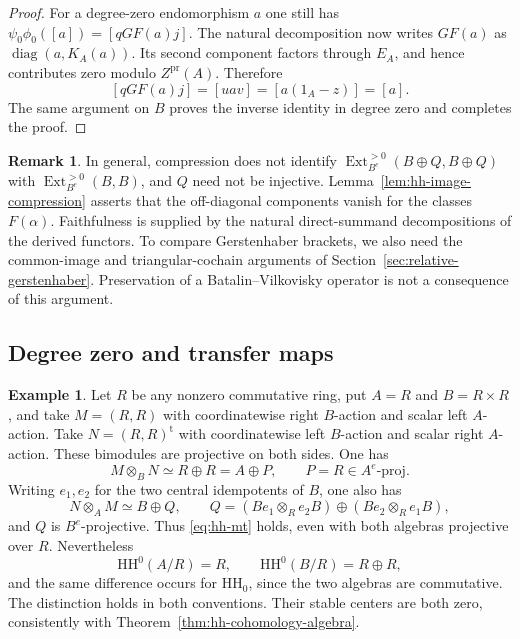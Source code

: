 \documentclass[12pt,a4paper,english,reqno]{amsart}
\numberwithin{equation}{section}
\theoremstyle{plain}
\theoremstyle{definition}
\newtheorem{example}[theorem]{Example}
\newtheorem{remark}[theorem]{Remark}
\begin{document}
\begin{proof}
For a degree-zero endomorphism $a$ one still has
$\psi_0\phi_0([a])=[qGF(a)j]$.
The natural decomposition now writes $GF(a)$ as
$\operatorname{diag}(a,K_A(a))$.  Its second component factors
through $E_A$, and hence contributes zero modulo
$Z^{\mathrm{pr}}(A)$.  Therefore
\[
 [qGF(a)j]=[uav]=[a(1_A-z)]=[a].
\]
The same argument on $B$ proves the inverse identity in degree
zero and completes the proof.
\end{proof}

\begin{remark}
In general, compression does not identify
$\operatorname{Ext}_{B^e}^{>0}(B\oplus Q,B\oplus Q)$ with
$\operatorname{Ext}_{B^e}^{>0}(B,B)$, and $Q$ need not be injective.
Lemma~\ref{lem:hh-image-compression} asserts that the off-diagonal
components vanish for the classes $F(\alpha)$.  Faithfulness is
supplied by the natural direct-summand decompositions of the derived
functors.  To compare Gerstenhaber brackets, we also need the
common-image and triangular-cochain arguments of
Section~\ref{sec:relative-gerstenhaber}.  Preservation of a
Batalin--Vilkovisky operator is not a consequence of this argument.
\end{remark}

\subsection{Degree zero and transfer maps}

\begin{example}
\label{ex:hh-degree-zero}
Let $R$ be any nonzero commutative ring, put $A=R$ and
$B=R\times R$, and take $M=(R,R)$ with coordinatewise right
$B$-action and scalar left $A$-action.  Take $N=(R,R)^{\mathrm t}$
with coordinatewise left $B$-action and scalar right $A$-action.
These bimodules are projective on both sides.  One has
\[
 M\otimes_BN\simeq R\oplus R=A\oplus P,
 \qquad P=R\in A^e\text{-}\mathrm{proj}.
\]
Writing $e_1,e_2$ for the two central idempotents of $B$, one also
has
\[
 N\otimes_AM\simeq B\oplus Q,
 \qquad
 Q=(Be_1\otimes_Re_2B)\oplus(Be_2\otimes_Re_1B),
\]
and $Q$ is $B^e$-projective.  Thus \eqref{eq:hh-mt} holds, even
with both algebras projective over $R$.  Nevertheless
\[
 \mathrm{HH}^{0}(A/R)=R,\qquad
 \mathrm{HH}^{0}(B/R)=R\oplus R,
\]
and the same difference occurs for $\mathrm{HH}_{0}$, since the
two algebras are commutative.  The distinction holds in both
conventions.  Their stable centers are both zero, consistently
with Theorem~\ref{thm:hh-cohomology-algebra}.
\end{example}
\end{document}
